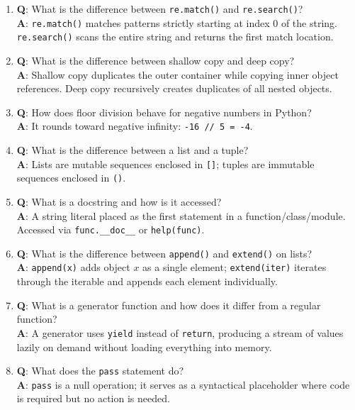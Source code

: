 \begin{enumerate}[leftmargin=1.5em]
    \item \textbf{Q}: What is the difference between \texttt{re.match()} and \texttt{re.search()}?\\
    \textbf{A}: \texttt{re.match()} matches patterns strictly starting at index 0 of the string. \texttt{re.search()} scans the entire string and returns the first match location.

    \item \textbf{Q}: What is the difference between shallow copy and deep copy?\\
    \textbf{A}: Shallow copy duplicates the outer container while copying inner object references. Deep copy recursively creates duplicates of all nested objects.

    \item \textbf{Q}: How does floor division behave for negative numbers in Python?\\
    \textbf{A}: It rounds toward negative infinity: \texttt{-16 // 5 = -4}.

    \item \textbf{Q}: What is the difference between a list and a tuple?\\
    \textbf{A}: Lists are mutable sequences enclosed in \texttt{[]}; tuples are immutable sequences enclosed in \texttt{()}.

    \item \textbf{Q}: What is a docstring and how is it accessed?\\
    \textbf{A}: A string literal placed as the first statement in a function/class/module. Accessed via \texttt{func.\_\_doc\_\_} or \texttt{help(func)}.

    \item \textbf{Q}: What is the difference between \texttt{append()} and \texttt{extend()} on lists?\\
    \textbf{A}: \texttt{append(x)} adds object $x$ as a single element; \texttt{extend(iter)} iterates through the iterable and appends each element individually.

    \item \textbf{Q}: What is a generator function and how does it differ from a regular function?\\
    \textbf{A}: A generator uses \texttt{yield} instead of \texttt{return}, producing a stream of values lazily on demand without loading everything into memory.

    \item \textbf{Q}: What does the \texttt{pass} statement do?\\
    \textbf{A}: \texttt{pass} is a null operation; it serves as a syntactical placeholder where code is required but no action is needed.


\end{enumerate}
